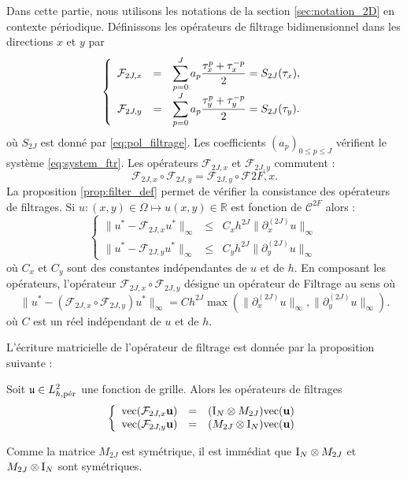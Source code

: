 Dans cette partie, nous utilisons les notations de la section \ref{sec:notation_2D} en contexte périodique. Définissons les opérateurs de filtrage bidimensionnel dans les directions $x$ et $y$ par
\begin{equation}
\left\lbrace
\begin{array}{rcl}
\mathcal{F}_{2J,x} & = & \gsum_{p=0}^J a_p \dfrac{\tau_x^p + \tau_x^{-p}}{2}  = S_{2J}(\tau_x), \\
\mathcal{F}_{2J,y} & = & \gsum_{p=0}^J a_p \dfrac{\tau_y^p + \tau_y^{-p}}{2} = S_{2J}(\tau_y).
\end{array}
\right.
\end{equation}
où $S_{2J}$ est donné par \eqref{eq:pol_filtrage}. 
Les coefficients $(a_p)_{0 \leq p \leq J}$ vérifient le système \eqref{eq:system_ftr}. Les opérateurs $\mathcal{F}_{2J,x}$ et $\mathcal{F}_{2J,y}$ commutent :
\begin{equation}
\mathcal{F}_{2J,x} \circ \mathcal{F}_{2J,y} = \mathcal{F}_{2J,y} \circ \mathcal{F}{2F,x}.
\end{equation}
La proposition \ref{prop:filter_def} permet de vérifier la consistance des opérateurs de filtrages.
Si $u : (x,y) \in \Omega \mapsto u(x,y) \in \mathbb{R}$ est fonction de $\mathcal{C}^{2F}$ alors :
\begin{equation}
\left\lbrace
\begin{array}{rcl}
\| u^* - \mathcal{F}_{2J,x}u^* \|_{\infty} & \leq & C_x h^{2J} \| \partial_x^{(2J)}u \|_{\infty}\\
\| u^* - \mathcal{F}_{2J,y}u^* \|_{\infty} & \leq & C_y h^{2J} \| \partial_y^{(2J)}u \|_{\infty}
\end{array}
\right.
\end{equation}
où $C_x$ et $C_y$ sont des constantes indépendantes de $u$ et de $h$.
En composant les opérateurs, l'opérateur $\mathcal{F}_{2J,x} \circ \mathcal{F}_{2J,y}$ désigne un opérateur de Filtrage au sens où
\begin{equation}
\| u^* - (\mathcal{F}_{2J,x} \circ \mathcal{F}_{2J,y}) u^* \|_{\infty} = C h^{2J} \max (\| \partial_x^{(2J)}u \|_{\infty}, \| \partial_y^{(2J)}u \|_{\infty}).
\end{equation}
où $C$ est un réel indépendant de $u$ et de $h$.

L'écriture matricielle de l'opérateur de filtrage est donnée par la proposition suivante :
\begin{proposition}
Soit $\mathfrak{u} \in L^2_{h,\per}$ une fonction de grille. Alors les opérateurs de filtrages
\begin{equation}
\left\lbrace
\begin{array}{rcl}
\text{vec} (\mathcal{F}_{2J,x} \mathbf{u}) & = & (\I_N \otimes M_{2J}) \text{vec} (\mathbf{u})\\
\text{vec} (\mathcal{F}_{2J,y} \mathbf{u}) & = & (M_{2J} \otimes \I_N) \text{vec} (\mathbf{u})\\
\end{array}
\right.
\end{equation}
\end{proposition}
Comme la matrice $M_{2J}$ est symétrique, il est immédiat que $\I_N \otimes M_{2J}$ et $M_{2J} \otimes \I_N$ sont symétriques.